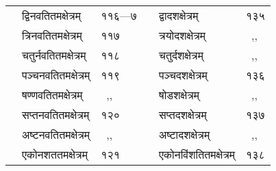 \documentclass[11pt, openany]{book}
\begin{document}
\begin{center}
\begin{tabular}{p{1.4in} l | p{1.6in} l}
~~द्विनवतितमक्षेत्रम् & ११६---७ & ~~द्वादशक्षेत्रम् & १३५\\
~~त्रिनवतितमक्षेत्रम् & ११७ & ~~त्रयोदशक्षेत्रम् & ~,,\\
~~चतुर्नवतितमक्षेत्रम् & ११८ & ~~चतुर्दशक्षेत्रम् & ~,,\\
~~पञ्चनवतितमक्षेत्रम् & ११९ & ~~पञ्चदशक्षेत्रम् & १३६\\
~~षण्णवतितमक्षेत्रम् & ~,, & ~~षोडशक्षेत्रम् & ~,,\\
~~सप्तनवतितमक्षेत्रम् & १२० & ~~सप्तदशक्षेत्रम् & १३७\\
~~अष्टनवतितमक्षेत्रम् & ~,, & ~~अष्टादशक्षेत्रम् & ~,,\\
~~एकोनशततमक्षेत्रम् & १२१ & ~~एकोनविंशतितमक्षेत्रम् & १३८\\
\end{tabular}
\end{center}
\end{document}
